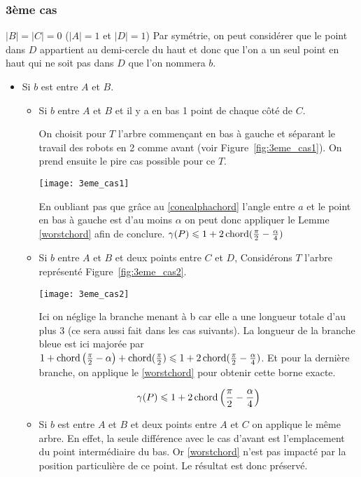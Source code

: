 \subsubsection*{3ème cas}\label{3cas} $|B| = |C| = 0$ ($|A| = 1$ et $|D| = 1$)
Par symétrie, on peut considérer que le point dans $D$ appartient au demi-cercle du haut et donc que l'on a un seul point en haut qui ne soit pas dans $D$ que l'on nommera $b$.

\begin{itemize}

\item \label{3cas1} Si $b$ est entre $A$ et $B$.

\begin{itemize}

\item \label{3cas11} Si $b$ entre $A$ et $B$ et il y a en bas 1 point de chaque
  côté de $C$.

On choisit pour $T$ l'arbre commençant en bas à gauche et séparant le travail
des robots en 2 comme avant (voir Figure~\ref{fig:3eme_cas1}).
On prend ensuite le pire cas possible pour ce $T$.

 \texttt{[image: 3eme\_cas1]}\label{fig:3eme_cas1}

En oubliant pas que grâce au \cref{conealphachord} l'angle entre $a$ et le point en bas à gauche est d'au moins $\alpha$ on peut donc appliquer le Lemme \ref{worstchord} afin de conclure.
$\gamma(P) \leqslant 1 + 2\operatorname{chord}(\frac{\pi}{2} - \frac{\alpha}{4})$

\item \label{3cas12} Si $b$ entre $A$ et $B$ et deux points entre $C$ et $D$,
	Considérons $T$ l'arbre représenté Figure~\ref{fig:3eme_cas2}.

  \texttt{[image: 3eme\_cas2]}\label{fig:3eme_cas2}

Ici on néglige la branche menant à b car elle a une longueur totale d'au plus 3 (ce sera
aussi fait dans les cas suivants).
La longueur de la branche bleue est ici majorée par $1+\operatorname{chord}\left(\frac{\pi}{2} - \alpha\right)+\operatorname{chord}(\frac{\pi}{2}) \leqslant 1 + 2\operatorname{chord}(\frac{\pi}{2} - \frac{\alpha}{4})$.
Et pour la dernière branche, on applique le \cref{worstchord} pour obtenir
cette borne exacte.

$$\gamma(P) \leqslant 1 + 2\operatorname{chord}\left(\frac{\pi}{2} -
  \frac{\alpha}{4}\right)$$

\item \label{3cas13} Si $b$ est entre $A$ et $B$ et deux points entre $A$
  et $C$ on applique le même arbre. En effet, la seule différence avec le cas d'avant est l'emplacement du point intermédiaire du bas. Or \cref{worstchord} n'est pas impacté par la position particulière de ce point. Le résultat est donc préservé.
  

\end{itemize}
\end{itemize}

